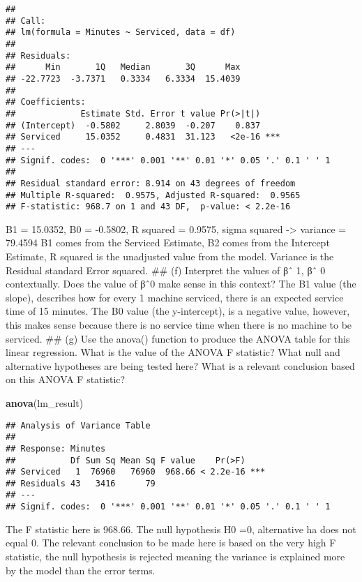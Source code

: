 \documentclass[
]{article}
\newenvironment{Shaded}{\begin{snugshade}}{\end{snugshade}}
\newcommand{\FunctionTok}[1]{\textcolor[rgb]{0.13,0.29,0.53}{\textbf{#1}}}
\newcommand{\NormalTok}[1]{#1}
\begin{document}
\begin{verbatim}
## 
## Call:
## lm(formula = Minutes ~ Serviced, data = df)
## 
## Residuals:
##      Min       1Q   Median       3Q      Max 
## -22.7723  -3.7371   0.3334   6.3334  15.4039 
## 
## Coefficients:
##             Estimate Std. Error t value Pr(>|t|)    
## (Intercept)  -0.5802     2.8039  -0.207    0.837    
## Serviced     15.0352     0.4831  31.123   <2e-16 ***
## ---
## Signif. codes:  0 '***' 0.001 '**' 0.01 '*' 0.05 '.' 0.1 ' ' 1
## 
## Residual standard error: 8.914 on 43 degrees of freedom
## Multiple R-squared:  0.9575, Adjusted R-squared:  0.9565 
## F-statistic: 968.7 on 1 and 43 DF,  p-value: < 2.2e-16
\end{verbatim}

B1 = 15.0352, B0 = -0.5802, R squared = 0.9575, sigma squared
-\textgreater{} variance = 79.4594 B1 comes from the Serviced Estimate,
B2 comes from the Intercept Estimate, R squared is the unadjusted value
from the model. Variance is the Residual standard Error squared. \#\#
(f) Interpret the values of βˆ 1, βˆ 0 contextually. Does the value of
βˆ0 make sense in this context? The B1 value (the slope), describes how
for every 1 machine serviced, there is an expected service time of 15
minutes. The B0 value (the y-intercept), is a negative value, however,
this makes sense because there is no service time when there is no
machine to be serviced. \#\# (g) Use the anova() function to produce the
ANOVA table for this linear regression. What is the value of the ANOVA F
statistic? What null and alternative hypotheses are being tested here?
What is a relevant conclusion based on this ANOVA F statistic?

\begin{Shaded}
\begin{Highlighting}[]
\FunctionTok{anova}\NormalTok{(lm\_result)}
\end{Highlighting}
\end{Shaded}

\begin{verbatim}
## Analysis of Variance Table
## 
## Response: Minutes
##           Df Sum Sq Mean Sq F value    Pr(>F)    
## Serviced   1  76960   76960  968.66 < 2.2e-16 ***
## Residuals 43   3416      79                      
## ---
## Signif. codes:  0 '***' 0.001 '**' 0.01 '*' 0.05 '.' 0.1 ' ' 1
\end{verbatim}

The F statistic here is 968.66. The null hypothesis H0 =0, alternative
ha does not equal 0. The relevant conclusion to be made here is based on
the very high F statistic, the null hypothesis is rejected meaning the
variance is explained more by the model than the error terms.
\end{document}
